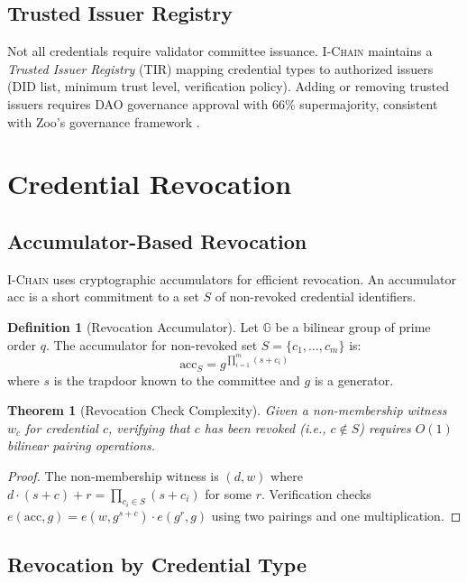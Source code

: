 \documentclass[11pt,letterpaper]{article}
\newtheorem{theorem}{Theorem}
\theoremstyle{definition}
\newtheorem{definition}{Definition}
\theoremstyle{remark}
\newcommand{\IChain}{\textsc{I-Chain}}
\begin{document}
\subsection{Trusted Issuer Registry}

Not all credentials require validator committee issuance. \IChain{} maintains a \emph{Trusted Issuer Registry} (TIR) mapping credential types to authorized issuers (DID list, minimum trust level, verification policy). Adding or removing trusted issuers requires DAO governance approval with 66\% supermajority, consistent with Zoo's governance framework \cite{zoo-dao-governance}.

\section{Credential Revocation}

\subsection{Accumulator-Based Revocation}

\IChain{} uses cryptographic accumulators \cite{camenisch2009accumulator} for efficient revocation. An accumulator $\text{acc}$ is a short commitment to a set $S$ of non-revoked credential identifiers.

\begin{definition}[Revocation Accumulator]
Let $\mathbb{G}$ be a bilinear group of prime order $q$. The accumulator for non-revoked set $S = \{c_1, \ldots, c_m\}$ is:
\[
\text{acc}_S = g^{\prod_{i=1}^{m}(s + c_i)}
\]
where $s$ is the trapdoor known to the committee and $g$ is a generator.
\end{definition}

\begin{theorem}[Revocation Check Complexity]
Given a non-membership witness $w_c$ for credential $c$, verifying that $c$ has been revoked (i.e., $c \notin S$) requires $O(1)$ bilinear pairing operations.
\end{theorem}

\begin{proof}
The non-membership witness is $(d, w)$ where $d \cdot (s + c) + r = \prod_{c_i \in S}(s + c_i)$ for some $r$. Verification checks $e(\text{acc}, g) = e(w, g^{s+c}) \cdot e(g^r, g)$ using two pairings and one multiplication.
\end{proof}

\subsection{Revocation by Credential Type}
\end{document}
